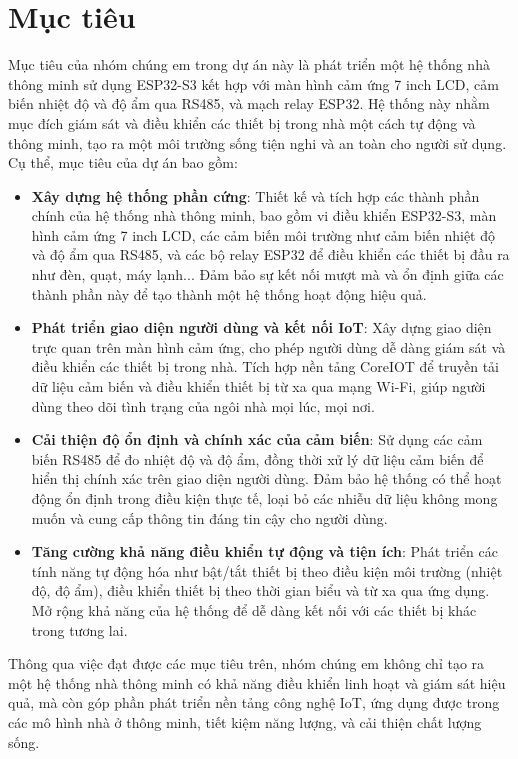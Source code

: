 \section{Mục tiêu}
\tab Mục tiêu của nhóm chúng em trong dự án này là phát triển một hệ thống nhà thông minh sử dụng ESP32-S3 kết hợp với màn hình cảm ứng 7 inch LCD, cảm biến nhiệt độ và độ ẩm qua RS485, và mạch relay ESP32. Hệ thống này nhằm mục đích giám sát và điều khiển các thiết bị trong nhà một cách tự động và thông minh, tạo ra một môi trường sống tiện nghi và an toàn cho người sử dụng. Cụ thể, mục tiêu của dự án bao gồm:
\begin{itemize} 
\item \textbf{Xây dựng hệ thống phần cứng}: Thiết kế và tích hợp các thành phần chính của hệ thống nhà thông minh, bao gồm vi điều khiển ESP32-S3, màn hình cảm ứng 7 inch LCD, các cảm biến môi trường như cảm biến nhiệt độ và độ ẩm qua RS485, và các bộ relay ESP32 để điều khiển các thiết bị đầu ra như đèn, quạt, máy lạnh... Đảm bảo sự kết nối mượt mà và ổn định giữa các thành phần này để tạo thành một hệ thống hoạt động hiệu quả. 
\item \textbf{Phát triển giao diện người dùng và kết nối IoT}: Xây dựng giao diện trực quan trên màn hình cảm ứng, cho phép người dùng dễ dàng giám sát và điều khiển các thiết bị trong nhà. Tích hợp nền tảng CoreIOT để truyền tải dữ liệu cảm biến và điều khiển thiết bị từ xa qua mạng Wi-Fi, giúp người dùng theo dõi tình trạng của ngôi nhà mọi lúc, mọi nơi. 
\item \textbf{Cải thiện độ ổn định và chính xác của cảm biến}: Sử dụng các cảm biến RS485 để đo nhiệt độ và độ ẩm, đồng thời xử lý dữ liệu cảm biến để hiển thị chính xác trên giao diện người dùng. Đảm bảo hệ thống có thể hoạt động ổn định trong điều kiện thực tế, loại bỏ các nhiễu dữ liệu không mong muốn và cung cấp thông tin đáng tin cậy cho người dùng. 
\item \textbf{Tăng cường khả năng điều khiển tự động và tiện ích}: Phát triển các tính năng tự động hóa như bật/tắt thiết bị theo điều kiện môi trường (nhiệt độ, độ ẩm), điều khiển thiết bị theo thời gian biểu và từ xa qua ứng dụng. Mở rộng khả năng của hệ thống để dễ dàng kết nối với các thiết bị khác trong tương lai. 
\end{itemize}
Thông qua việc đạt được các mục tiêu trên, nhóm chúng em không chỉ tạo ra một hệ thống nhà thông minh có khả năng điều khiển linh hoạt và giám sát hiệu quả, mà còn góp phần phát triển nền tảng công nghệ IoT, ứng dụng được trong các mô hình nhà ở thông minh, tiết kiệm năng lượng, và cải thiện chất lượng sống.
